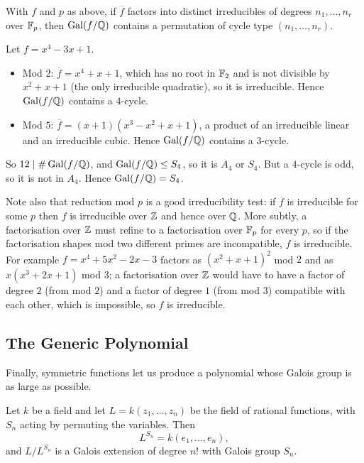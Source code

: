 \documentclass[a4paper]{scrartcl}
\newcommand{\Gal}{\operatorname{Gal}}
\begin{document}
\begin{corollary}\label{cor:dedekind}
	With $f$ and $p$ as above, if $\overline f$ factors into distinct irreducibles of degrees $n_1,\dots,n_r$ over $\mathbb{F}_p$, then $\Gal(f/\Q)$ contains a permutation of cycle type $(n_1,\dots,n_r)$.
\end{corollary}

\begin{example}
	Let $f = x^4 - 3x+1$.
	\begin{itemize}
		\item Mod $2$: $\overline f = x^4+x+1$, which has no root in $\mathbb{F}_2$ and is not divisible by $x^2+x+1$ (the only irreducible quadratic), so it is irreducible. Hence $\Gal(f/\Q)$ contains a $4$-cycle.
		\item Mod $5$: $\overline f = (x+1)(x^3-x^2+x+1)$, a product of an irreducible linear and an irreducible cubic. Hence $\Gal(f/\Q)$ contains a $3$-cycle.
	\end{itemize}
	So $12 \mid \#\Gal(f/\Q)$, and $\Gal(f/\Q) \leq S_4$, so it is $A_4$ or $S_4$. But a $4$-cycle is odd, so it is not in $A_4$. Hence $\Gal(f/\Q) = S_4$.
\end{example}

Note also that reduction mod $p$ is a good irreducibility test: if $\overline f$ is irreducible for some $p$ then $f$ is irreducible over $\mathbb{Z}$ and hence over $\mathbb{Q}$. More subtly, a factorisation over $\mathbb{Z}$ must refine to a factorisation over $\mathbb{F}_p$ for every $p$, so if the factorisation shapes mod two different primes are incompatible, $f$ is irreducible. For example $f = x^4+5x^2-2x-3$ factors as $(x^2+x+1)^2$ mod $2$ and as $x(x^3+2x+1)$ mod $3$; a factorisation over $\mathbb{Z}$ would have to have a factor of degree $2$ (from mod $2$) and a factor of degree $1$ (from mod $3$) compatible with each other, which is impossible, so $f$ is irreducible.

\subsection{The Generic Polynomial}

Finally, symmetric functions let us produce a polynomial whose Galois group is as large as possible.

\begin{theorem}\label{thm:generic}
	Let $k$ be a field and let $L = k(z_1,\dots,z_n)$ be the field of rational functions, with $S_n$ acting by permuting the variables. Then
	$$L^{S_n} = k(e_1,\dots,e_n),$$
	and $L/L^{S_n}$ is a Galois extension of degree $n!$ with Galois group $S_n$.
\end{theorem}
\end{document}
